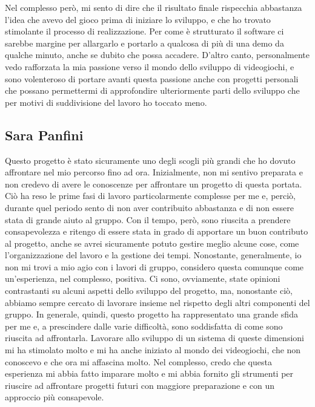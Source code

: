 \documentclass[a4paper,12pt]{report}
\begin{document}
\newline Nel complesso però, mi sento di dire che il risultato finale rispecchia abbastanza l'idea che avevo del gioco prima di iniziare lo sviluppo, e che ho trovato stimolante il processo di realizzazione. Per come è strutturato il software ci sarebbe margine per allargarlo e portarlo a qualcosa di più di una demo da qualche minuto, anche se dubito che possa accadere. D'altro canto, personalmente vedo rafforzata la mia passione verso il mondo dello sviluppo di videogiochi, e sono volenteroso di portare avanti questa passione anche con progetti personali che possano permettermi di approfondire ulteriormente parti dello sviluppo che per motivi di suddivisione del lavoro ho toccato meno.


\subsection{Sara Panfini}
Questo progetto è stato sicuramente uno degli scogli più grandi che ho dovuto affrontare nel 
mio percorso fino ad ora.\newline 
Inizialmente, non mi sentivo preparata e non credevo di avere le conoscenze
per affrontare un progetto di questa portata. Ciò ha reso le prime fasi di lavoro particolarmente complesse
per me e, perciò, durante quel periodo sento di non aver contribuito abbastanza e di non 
essere stata di grande aiuto al gruppo. Con il tempo, però, sono riuscita a prendere consapevolezza e ritengo
di essere stata in grado di apportare un buon contributo al progetto, anche se avrei sicuramente potuto gestire 
meglio alcune cose, come l'organizzazione del lavoro e la gestione dei tempi.\newline
Nonostante, generalmente, io non mi trovi a mio agio con i lavori di gruppo, considero questa comunque come
un'esperienza, nel complesso, positiva. Ci sono, ovviamente, state opinioni contrastanti su alcuni aspetti
dello sviluppo del progetto, ma, nonostante ciò, abbiamo sempre cercato di lavorare insieme nel rispetto degli 
altri componenti del gruppo.\newline
In generale, quindi, questo progetto ha rappresentato una grande sfida per me e, a prescindere dalle varie
difficoltà, sono soddisfatta di come sono riuscita ad affrontarla. Lavorare allo sviluppo di un sistema di queste
dimensioni mi ha stimolato molto e mi ha anche iniziato al mondo dei videogiochi, che non conoscevo e che ora mi affascina molto.
Nel complesso, credo che questa esperienza mi abbia fatto imparare molto e mi abbia fornito gli strumenti 
per riuscire ad affrontare progetti futuri con maggiore preparazione e con un approccio più consapevole.
\end{document}
